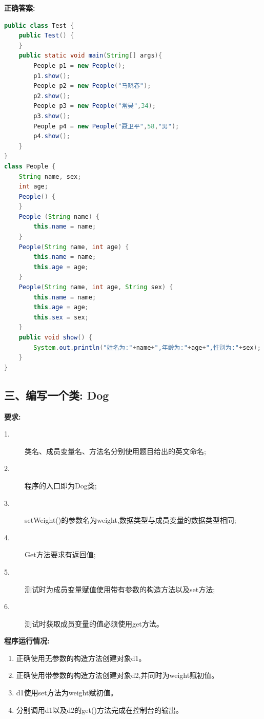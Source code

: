 \documentclass[a4paper,12pt]{article}
\begin{document}
\textbf{正确答案:}

\begin{lstlisting}[language=Java, caption=People类与测试]
public class Test {
    public Test() {
    }
    public static void main(String[] args){
        People p1 = new People();
        p1.show();
        People p2 = new People("马晓春");
        p2.show();
        People p3 = new People("常昊",34);
        p3.show();
        People p4 = new People("聂卫平",58,"男");
        p4.show();
    }
}
class People {
    String name, sex;
    int age;
    People() {
    }
    People (String name) {
        this.name = name;
    }
    People(String name, int age) {
        this.name = name;
        this.age = age;
    }
    People(String name, int age, String sex) {
        this.name = name;
        this.age = age;
        this.sex = sex;
    }
    public void show() {
        System.out.println("姓名为:"+name+",年龄为:"+age+",性别为:"+sex);
    }
}
\end{lstlisting}

\subsection{三、编写一个类: Dog}

\textbf{要求:}
\begin{description}
	\item[1.] 类名、成员变量名、方法名分别使用题目给出的英文命名;
	\item[2.] 程序的入口即为Dog类;
	\item[3.] setWeight()的参数名为weight,数据类型与成员变量的数据类型相同;
	\item[4.] Get方法要求有返回值;
	\item[5.] 测试时为成员变量赋值使用带有参数的构造方法以及set方法;
	\item[6.] 测试时获取成员变量的值必须使用get方法。
\end{description}

\textbf{程序运行情况:}
\begin{enumerate}
	\item 正确使用无参数的构造方法创建对象d1。
	\item 正确使用带参数的构造方法创建对象d2,并同时为weight赋初值。
	\item d1使用set方法为weight赋初值。
	\item 分别调用d1以及d2的get()方法完成在控制台的输出。
\end{enumerate}
\end{document}
